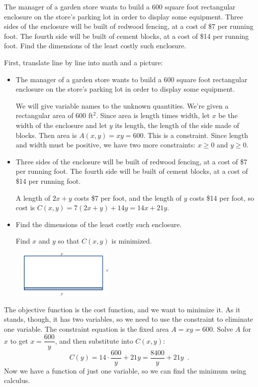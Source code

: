 \begin{example}
The manager of a garden store wants to build a 600 square foot rectangular enclosure on the store's parking lot in order to display some equipment. Three sides of the enclosure will be built of redwood fencing, at a cost of \$7 per running foot. The fourth side will be built of cement blocks, at a cost of \$14 per running foot. Find the dimensions of the least costly such enclosure.

\begin{solution} First, translate line by line into math and a picture:

\begin{itemize}
  \item The manager of a garden store wants to build a 600 square foot rectangular enclosure on the store's parking lot in order to display some equipment.

  We will give variable names to the unknown quantities. We're given a rectangular area of 600 ft$^2$. Since area is length times width, let $x$ be the width of the enclosure and let $y$ its length, the length of the side made of blocks. Then area is $A(x, y) = xy = 600$. This is a constraint. Since length and width must be positive, we have two more constraints: $x\ge 0$ and $y\ge 0$.

  \item Three sides of the enclosure will be built of redwood fencing, at a cost of \$7 per running foot. The fourth side will be built of cement blocks, at a cost of \$14 per running foot.

  A length of $2x+y$ costs \$7 per foot, and the length of $y$ costs \$14 per foot, so cost is
  $C(x, y) = 7(2x+y)+14y = 14x+21y$.

  \item Find the dimensions of the least costly such enclosure.

  Find $x$ and $y$ so that $C(x, y)$ is minimized.
\end{itemize}

\begin{figure}[!ht]
  \centering
    \includegraphics[width=0.4\textwidth]{img/chap3/image090.png}
\end{figure}
The objective function is the cost function, and we want to minimize it. As it stands, though, it has two variables, so we need to use the constraint to eliminate one variable. The constraint equation is the fixed area $A=xy=600$. Solve $A$ for $x$ to get $x=\dfrac{600}{y}$, and then substitute into $C(x, y)$:
$$C(y)=14\cdot\dfrac{600}{y}+21y=\dfrac{8400}{y} + 21y \enspace .$$
Now we have a function of just one variable, so we can find the minimum using calculus.


\end{solution}
\end{example}
